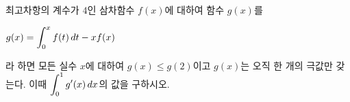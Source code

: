 최고차항의 계수가 $4$인 삼차함수 $f(x)$에 대하여 함수 $g(x)$를 \par\smallskip\noindent\hspace*{1.5em}$g(x)=\displaystyle\int_{0}^{x} f(t)\mkern3mu dt-xf(x)$\par\smallskip\noindent 라 하면 모든 실수 $x$에 대하여 $g(x)\le g(2)$이고 $g(x)$는 오직 한 개의 극값만 갖는다. 이때 $\displaystyle\int_{0}^{1} g'(x)\mkern3mu dx$의 값을 구하시오.
